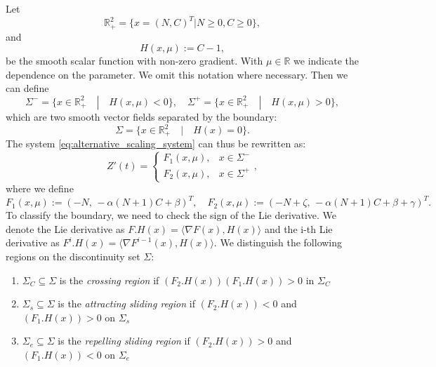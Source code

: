 \documentclass[12pt,a4paper]{article}
\begin{document}
Let 
\begin{equation}
    \mathbb{R}_{+}^{2}= \{x=(N, C)^T | N \geq 0,  C \geq 0\},
\end{equation}
and
\begin{equation}
    H(x, \mu) := C - 1,
\end{equation}
be the smooth scalar function with non-zero gradient. With $\mu \in \mathbb{R}$ we indicate the dependence on the parameter. We omit this notation where necessary. Then we can define 
\begin{equation}\label{eq:sigmas}
    \Sigma^{-} = \{x \in \mathbb{R}_{+}^{2} \quad | \quad H(x, \mu) < 0 \}, \quad \Sigma^{+} = \{x \in \mathbb{R}_{+}^{2} \quad | \quad H(x, \mu) > 0 \},
\end{equation}
which are two smooth vector fields separated by the boundary:
\begin{equation}
    \Sigma = \{x \in \mathbb{R}_{+}^{2} \quad | \quad H(x) = 0 \}.
\end{equation}
The system \eqref{eq:alternative_scaling_system} can thus be rewritten as:
\begin{equation}
    Z'(t) = \begin{cases}
        F_1(x, \mu), & x \in \Sigma^{-}\\
        F_2(x, \mu), & x \in \Sigma^{+}
    \end{cases},
\end{equation}
where we define
\begin{equation}
    F_1(x, \mu) := (-N, \, -\alpha (N+1)C + \beta)^T, \quad F_2(x, \mu) := (-N + \zeta, \, -\alpha (N+1)C + \beta + \gamma)^T.
\end{equation}
To classify the boundary, we need to check the sign of the Lie derivative. We denote the Lie derivative as $F.H(x) = \langle \nabla F(x), H(x) \rangle$ and the i-th Lie derivative as $F^i.H(x) = \langle \nabla F^{i-1}(x), H(x) \rangle$. We distinguish the following regions on the discontinuity set $\Sigma$:
\begin{enumerate}
    \item $\Sigma_C \subseteq \Sigma$ is the \emph{crossing region} if $(F_2.H(x))(F_1.H(x)) > 0$ in $\Sigma_C$
    \item $\Sigma_s \subseteq \Sigma$ is the \emph{attracting sliding region} if $(F_2.H(x)) < 0$ and $(F_1.H(x)) > 0$ on $\Sigma_s$
    \item $\Sigma_e \subseteq \Sigma$ is the \emph{repelling sliding region} if $(F_2.H(x)) > 0$ and $(F_1.H(x)) < 0$ on $\Sigma_e$
\end{enumerate}
\end{document}
